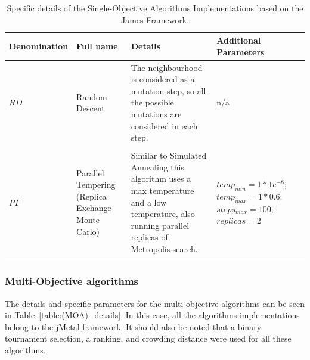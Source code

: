 \begin{table}[H]
    \begin{tabular}{p{}p{}p{}p{}p{}}
    \hline
    Denomination  & Full name & Details & Additional Parameters 
    \\
    \hline
    $RD$ & Random Descent & The neighbourhood is considered as a mutation step, so all the possible mutations are considered in each step. & n/a \\ \\
    $PT$ & Parallel Tempering (Replica Exchange Monte Carlo) & Similar to Simulated Annealing this algorithm uses a max temperature and a low temperature, also running parallel replicas of Metropolis search.& $temp_{min} = 1 * 1e^{-8}$;$temp_{max} = 1 * 0.6$; $steps_{max} = 100$; $replicas = 2$ \\ \\
    \hline
    \end{tabular}
    \caption{Specific details of the Single-Objective Algorithms Implementations based on the James Framework.}
    \label{table:(SOA)_details_james}
\end{table}

\subsubsection{Multi-Objective algorithms}

The details and specific parameters for the multi-objective algorithms can be seen in Table~\ref{table:(MOA)_details}. In this case, all the algorithms implementations belong to the jMetal framework. It should also be noted that a binary tournament selection, a ranking, and crowding distance were used for all these algorithms.

